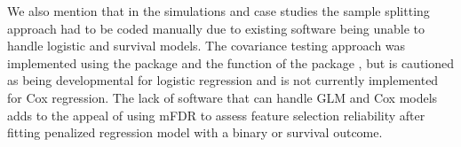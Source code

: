 We also mention that in the simulations and case studies the sample splitting approach had to be coded manually due to existing software being unable to handle logistic and survival models. The covariance testing approach was implemented using the  package \citep{CovTest} and the  function of the  package \citep{Selective_Inference}, but is cautioned as being developmental for logistic regression and is not currently implemented for Cox regression. The lack of software that can handle GLM and Cox models adds to the appeal of using mFDR to assess feature selection reliability after fitting penalized regression model with a binary or survival outcome.
